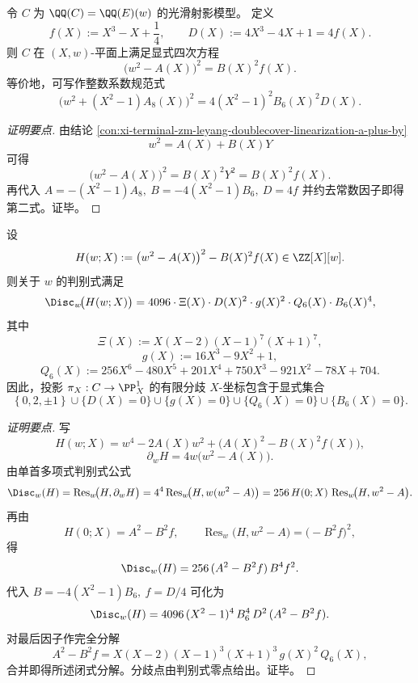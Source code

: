 \begin{conclusion}[曲线 \(C\) 的平面四次模型与双二次规范方程]\label{con:xi-terminal-zm-leyang-doublecover-plane-quartic-model}
令 \(C\) 为 \(\QQ(C)=\QQ(E)(w)\) 的光滑射影模型。
定义
\[
f(X):=X^3-X+\frac14,\qquad D(X):=4X^3-4X+1=4f(X).
\]
则 \(C\) 在 \((X,w)\)-平面上满足显式四次方程
\[
\bigl(w^2-A(X)\bigr)^2=B(X)^2f(X).
\]
等价地，可写作整数系数规范式
\[
\bigl(w^2+(X^2-1)A_8(X)\bigr)^2
=
4(X^2-1)^2B_6(X)^2D(X).
\]
\end{conclusion}
\begin{proof}[证明要点]
由结论 \ref{con:xi-terminal-zm-leyang-doublecover-linearization-a-plus-by}
\[
w^2=A(X)+B(X)Y
\]
可得
\[
\bigl(w^2-A(X)\bigr)^2=B(X)^2Y^2=B(X)^2f(X).
\]
再代入
\(
A=-(X^2-1)A_8,\ B=-4(X^2-1)B_6,\ D=4f
\)
并约去常数因子即得第二式。证毕。
\end{proof}

\begin{conclusion}\label{con:xi-terminal-zm-leyang-quartic-projection-discriminant-full-factorization}
设
\[
H(w;X):=\bigl(w^2-A(X)\bigr)^2-B(X)^2f(X)\in\ZZ[X][w].
\]
则关于 \(w\) 的判别式满足
\[
\Disc_w\!\bigl(H(w;X)\bigr)
=4096\cdot \Xi(X)\cdot D(X)^2\cdot g(X)^2\cdot Q_6(X)\cdot B_6(X)^4,
\]
其中
\[
\Xi(X):=X(X-2)(X-1)^7(X+1)^7,
\]
\[
g(X):=16X^3-9X^2+1,
\]
\[
Q_6(X):=256X^6-480X^5+201X^4+750X^3-921X^2-78X+704.
\]
因此，投影 \(\pi_X:C\to \PP^1_X\) 的有限分歧 \(X\)-坐标包含于显式集合
\[
\left\{0,2,\pm1\right\}
\cup\{D(X)=0\}
\cup\{g(X)=0\}
\cup\{Q_6(X)=0\}
\cup\{B_6(X)=0\}.
\]
\end{conclusion}
\begin{proof}[证明要点]
写
\[
H(w;X)=w^4-2A(X)w^2+\bigl(A(X)^2-B(X)^2f(X)\bigr),
\]
\[
\partial_w H=4w\bigl(w^2-A(X)\bigr).
\]
由单首多项式判别式公式
\[
\Disc_w(H)=\operatorname{Res}_w\!\bigl(H,\partial_wH\bigr)
=4^4\operatorname{Res}_w\!\bigl(H,w(w^2-A)\bigr)
=256\,H(0;X)\,\operatorname{Res}_w\!\bigl(H,w^2-A\bigr).
\]
再由
\[
H(0;X)=A^2-B^2f,\qquad
\operatorname{Res}_w\!\bigl(H,w^2-A\bigr)=\bigl(-B^2f\bigr)^2,
\]
得
\[
\Disc_w(H)=256\,(A^2-B^2f)\,B^4f^2.
\]
代入 \(B=-4(X^2-1)B_6,\ f=D/4\) 可化为
\[
\Disc_w(H)=4096\,(X^2-1)^4\,B_6^4\,D^2\,(A^2-B^2f).
\]
对最后因子作完全分解
\[
A^2-B^2f
=X(X-2)(X-1)^3(X+1)^3\,g(X)^2\,Q_6(X),
\]
合并即得所述闭式分解。分歧点由判别式零点给出。证毕。
\end{proof}

